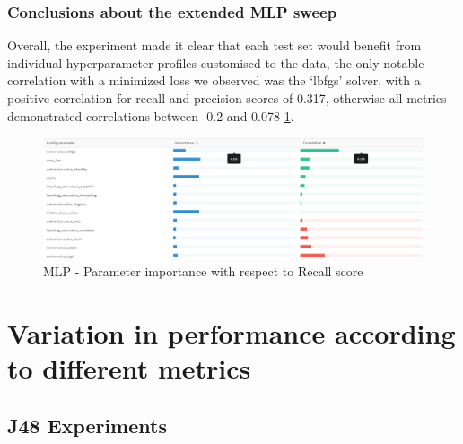 \documentclass[11pt]{article}
\begin{document}
\subsubsection{Conclusions about the extended MLP sweep}

Overall, the experiment made it clear that each test set would benefit from individual hyperparameter profiles customised to the data, the only notable correlation with a minimized loss we observed was the ‘lbfgs’ solver, with a positive correlation for recall and precision scores of 0.317, otherwise all metrics demonstrated correlations between -0.2 and 0.078 \ref{MLPSweepAccuracy}.

\begin{figure}[H]
  \centering 
  \includegraphics[width = \textwidth, height = 0.4\textwidth, keepaspectratio]{Images/MLPParamImp-Recall.png} 
  \caption {MLP - Parameter importance with respect to Recall score} \label{MLPSweepAccuracy}
\end{figure}




\newpage
\section{Variation in performance according to different metrics}
\subsection{J48 Experiments}
\end{document}
